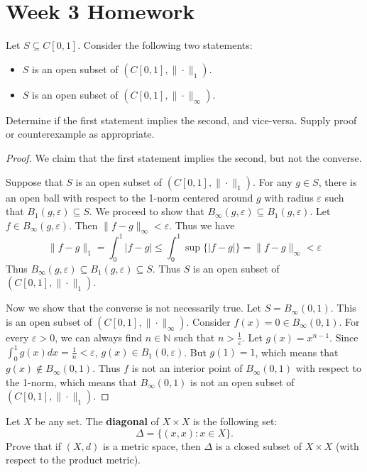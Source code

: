 \documentclass{article}
\theoremstyle{plain} %
\numberwithin{thm}{section} %
\theoremstyle{definition}
\begin{document}
\section{Week 3 Homework}
    \exercise Let $S\subseteq C[0,1]$. Consider the following two statements:
    \begin{itemize}
        \item $S$ is an open subset of $(C[0,1],\|\cdot\|_1)$.
        \item $S$ is an open subset of $(C[0,1],\|\cdot\|_\infty)$.
    \end{itemize}
    Determine if the first statement implies the second, and vice-versa. Supply proof or counterexample as appropriate.

    \begin{proof}
        We claim that the first statement implies the second, but not the converse.

        Suppose that \(S\) is an open subset of \((C[0,1], \|\cdot\|_1)\). For any \(g \in S\), there is an open ball with respect to the 1-norm centered around \(g\) with radius \(\varepsilon\) such that \(B_1 (g, \varepsilon)\subseteq S\). We proceed to show that \(B_\infty (g, \varepsilon) \subseteq B_1 (g, \varepsilon)\). Let \(f \in B_\infty (g, \varepsilon)\). Then \(\|f-g\| _\infty < \varepsilon\). Thus we have
        \[
            \|f-g\| _1 = \int _0^1 \left\vert f-g \right\vert \leq \int _0^1 \sup \{ \left\vert f-g \right\vert \} = \|f-g\| _\infty < \varepsilon 
        \]
        Thus \(B_\infty (g, \varepsilon) \subseteq B_1 (g, \varepsilon) \subseteq S\). Thus \(S\) is an open subset of \((C[0,1], \|\cdot \| _1)\).

        Now we show that the converse is not necessarily true. Let \(S = B_\infty (0, 1)\). This is an open subset of \((C[0,1],\|\cdot\|_\infty)\). Consider \(f(x) = 0 \in B_\infty (0, 1)\). For every \(\varepsilon > 0\), we can always find \(n \in \mathbb{N}\) such that \(n > \frac{1}{\varepsilon}\). Let \(g(x) = x^{n-1}\). Since \(\int _0^1 g(x)dx = \frac{1}{n} < \varepsilon\), \(g(x) \in B_1(0, \varepsilon)\). But \(g(1) = 1\), which means that \(g(x) \notin B_\infty (0, 1)\). Thus \(f\) is not an interior point of \(B_\infty (0, 1)\) with respect to the 1-norm, which means that \(B_\infty (0, 1)\) is not an open subset of \((C[0,1],\|\cdot\|_1)\).
        
    \end{proof}
        \exercise Let $X$ be any set. The \textbf{diagonal} of $X\times X$ is the following set:
        \[ \Delta = \{(x,x) : x \in X\}. \]
        Prove that if $(X,d)$ is a metric space, then $\Delta$ is a closed subset of $X\times X$ (with respect to the product metric).
\end{document}
